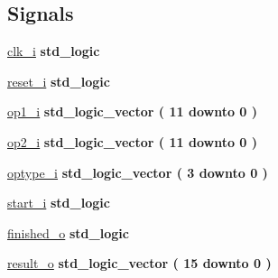 \subsection*{Signals}
 \begin{DoxyCompactItemize}
\item 
\hyperlink{classtb__alu_1_1sim_a51bcb92d1464ea7874528ced3e160ff1}{clk\+\_\+i} {\bfseries \textcolor{comment}{std\+\_\+logic}\textcolor{vhdlchar}{ }} 
\item 
\hyperlink{classtb__alu_1_1sim_acdf401306b90eed21a930a1cdc85e912}{reset\+\_\+i} {\bfseries \textcolor{comment}{std\+\_\+logic}\textcolor{vhdlchar}{ }} 
\item 
\hyperlink{classtb__alu_1_1sim_a8c60ff20331a9cd9b08c5a142fc84aa3}{op1\+\_\+i} {\bfseries \textcolor{comment}{std\+\_\+logic\+\_\+vector}\textcolor{vhdlchar}{ }\textcolor{vhdlchar}{(}\textcolor{vhdlchar}{ }\textcolor{vhdlchar}{ } \textcolor{vhdldigit}{11} \textcolor{vhdlchar}{ }\textcolor{keywordflow}{downto}\textcolor{vhdlchar}{ }\textcolor{vhdlchar}{ } \textcolor{vhdldigit}{0} \textcolor{vhdlchar}{ }\textcolor{vhdlchar}{)}\textcolor{vhdlchar}{ }} 
\item 
\hyperlink{classtb__alu_1_1sim_aa276f04f45d1c99bdc54e15f6c7208cb}{op2\+\_\+i} {\bfseries \textcolor{comment}{std\+\_\+logic\+\_\+vector}\textcolor{vhdlchar}{ }\textcolor{vhdlchar}{(}\textcolor{vhdlchar}{ }\textcolor{vhdlchar}{ } \textcolor{vhdldigit}{11} \textcolor{vhdlchar}{ }\textcolor{keywordflow}{downto}\textcolor{vhdlchar}{ }\textcolor{vhdlchar}{ } \textcolor{vhdldigit}{0} \textcolor{vhdlchar}{ }\textcolor{vhdlchar}{)}\textcolor{vhdlchar}{ }} 
\item 
\hyperlink{classtb__alu_1_1sim_a1a0a59366519e7db193082632d0164f8}{optype\+\_\+i} {\bfseries \textcolor{comment}{std\+\_\+logic\+\_\+vector}\textcolor{vhdlchar}{ }\textcolor{vhdlchar}{(}\textcolor{vhdlchar}{ }\textcolor{vhdlchar}{ } \textcolor{vhdldigit}{3} \textcolor{vhdlchar}{ }\textcolor{keywordflow}{downto}\textcolor{vhdlchar}{ }\textcolor{vhdlchar}{ } \textcolor{vhdldigit}{0} \textcolor{vhdlchar}{ }\textcolor{vhdlchar}{)}\textcolor{vhdlchar}{ }} 
\item 
\hyperlink{classtb__alu_1_1sim_a414f95cbdddc836387d71b48c83730c8}{start\+\_\+i} {\bfseries \textcolor{comment}{std\+\_\+logic}\textcolor{vhdlchar}{ }} 
\item 
\hyperlink{classtb__alu_1_1sim_ab0632c3f5d92d282b6559777bd6dc018}{finished\+\_\+o} {\bfseries \textcolor{comment}{std\+\_\+logic}\textcolor{vhdlchar}{ }} 
\item 
\hyperlink{classtb__alu_1_1sim_a9dbda0fe1ce0149ac85e0c8e3bc9d201}{result\+\_\+o} {\bfseries \textcolor{comment}{std\+\_\+logic\+\_\+vector}\textcolor{vhdlchar}{ }\textcolor{vhdlchar}{(}\textcolor{vhdlchar}{ }\textcolor{vhdlchar}{ } \textcolor{vhdldigit}{15} \textcolor{vhdlchar}{ }\textcolor{keywordflow}{downto}\textcolor{vhdlchar}{ }\textcolor{vhdlchar}{ } \textcolor{vhdldigit}{0} \textcolor{vhdlchar}{ }\textcolor{vhdlchar}{)}\textcolor{vhdlchar}{ }} 

\end{DoxyCompactItemize}

